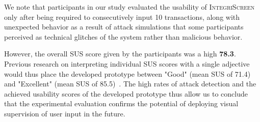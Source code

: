 \documentclass[sigconf, anonymous, balance=false]{acmart}
\newcommand{\updatelater}[1]{#1\xspace}
\newcommand{\sysname}{\textsc{IntegriScreen}\xspace}
\begin{document}
We note that participants in our study evaluated the usability of \sysname only after being required to consecutively input 10 transactions, along with unexpected behavior as a result of attack simulations that some participants perceived as technical glitches of the system rather than malicious behavior.

However, the overall SUS score given by the participants was a high \textbf{\updatelater{78.3}}.
Previous research on interpreting individual SUS scores with a single adjective would thus place the developed prototype between "Good" (mean SUS of 71.4) and "Excellent" (mean SUS of 85.5)~\cite{interpretingSUS}.
The high rates of attack detection and the achieved usability scores of the developed prototype thus allow us to conclude that the experimental evaluation confirms the potential of deploying visual supervision of user input in the future.







\end{document}
